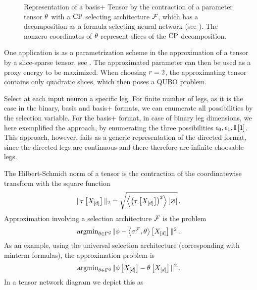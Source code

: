 \begin{figure}[h]
    \begin{center}
        
    \end{center}
    \caption{Representation of a basis+ Tensor by the contraction of a parameter tensor $\theta$ with a $\mathrm{CP}$ selecting architecture $\mathcal{F}$, which has a decomposition as a formula selecting neural network (see ).
    The nonzero coordinates of $\theta$ represent slices of the $\mathrm{CP}$ decomposition.
    }
\end{figure}\label{fig:sliceSelectingNN}



One application is as a parametrization scheme in the approximation of a tensor by a slice-sparse tensor, see .
The approximated parameter can then be used as a proxy energy to be maximized.
When choosing $r=2$, the approximating tensor contains only quadratic slices, which then poses a QUBO problem.

\begin{remark}
    Select at each input neuron a specific leg.
    For finite number of legs, as it is the case in the binary, basis and basis+ formats, we can enumerate all possibilities by the selection variable.
    For the basis+ format, in case of binary leg dimensions, we here exemplified the approach, by enumerating the three possibilities $\epsilon_{0},\epsilon_{1},\mathbb{I}\left[1\right]$.
    This approach, however, fails as a generic representation of the directed format, since the directed legs are continuous and there therefore are infinite choosable legs.
\end{remark}






The Hilbert-Schmidt norm of a tensor is the contraction of the coordinatewise transform with the square function
\begin{align*}
	\|\tau\left[X_{[d]}\right]\|_2= \sqrt{\left\langle \left(\tau\left[X_{[d]}\right]\right)^2\right\rangle \left[ \varnothing \right]} \, .
\end{align*}
Approximation involving a selection architecture $\mathcal{F}$ is the problem
	\[ \mathrm{argmin}_{\theta\in\Gamma^{\mathcal{G}}} \|\phi - \left\langle \sigma^{\mathcal{F}},\theta\right\rangle \left[ X_{[d]} \right]\|^2 \, . \]
As an example, using the universal selection architecture (corresponding with minterm formulas), the approximation problem is
	\[ \mathrm{argmin}_{\theta\in\Gamma^{\mathcal{G}}} \|\phi\left[X_{[d]}\right] - \theta\left[X_{[d]}\right]\|^2 \, . \]
In a tensor network diagram we depict this as
\begin{center}
    
\end{center}


